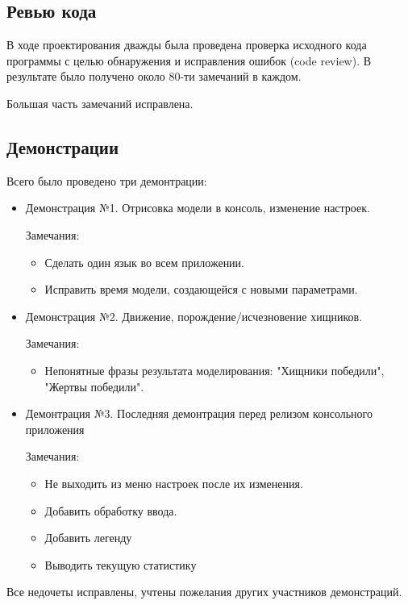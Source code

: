 \documentclass[a4paper]{article}
\begin{document}
\subsection{Ревью кода}
В ходе проектирования дважды была проведена проверка исходного кода программы с целью обнаружения и исправления ошибок (code review). В результате было получено около 80-ти замечаний в каждом.

Большая часть замечаний исправлена. 
\subsection{Демонстрации}
Всего было проведено три демонтрации:
\begin{itemize}

\item Демонстрация №1.
Отрисовка модели в консоль, изменение настроек.

Замечания:

\begin{itemize}
\item Сделать один язык во всем приложении. 
\item Исправить время модели, создающейся с новыми параметрами.
\end{itemize}

\item Демонстрация №2.
Движение, порождение/исчезновение хищников.

Замечания:

\begin{itemize}
\item Непонятные фразы результата моделирования: "Хищники победили", "Жертвы победили".
\end{itemize}

\item Демонтрация №3.
Последняя демонтрация перед релизом консольного приложения

Замечания:

\begin{itemize}
\item Не выходить из меню настроек после их изменения.
\item Добавить обработку ввода.
\item Добавить легенду
\item Выводить текущую статистику
\end{itemize}

\end{itemize} 
Все недочеты исправлены, учтены пожелания других участников демонстраций. 
\end{document}
